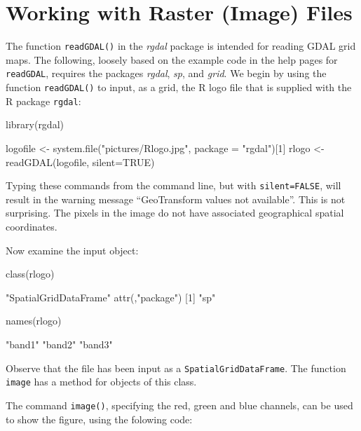 \documentclass{tufte-book}\usepackage[]{graphicx}\usepackage[]{color}
\newcommand{\txtt}[1]{\texttt{#1}}
\begin{document}
\section{Working with Raster (Image) Files}
The function \txtt{readGDAL()} in the {\em rgdal} package is
intended for reading GDAL grid maps.
The following, loosely based on the example code in the help pages for
\txtt{readGDAL}, requires the packages {\em rgdal}, {\em sp}, and
       {\em grid}.  We begin by using the function \txtt{readGDAL()}
to input, as a grid, the R logo file that is supplied with the
R package \txtt{rgdal}:
\begin{Schunk}
\begin{Sinput}
library(rgdal)
\end{Sinput}
\begin{Sinput}
logofile <- system.file("pictures/Rlogo.jpg",
                        package = "rgdal")[1]
rlogo <- readGDAL(logofile, silent=TRUE)
\end{Sinput}
\end{Schunk}
Typing these commands from the command line, but with
\txtt{silent=FALSE}, will result in the warning message ``GeoTransform
values not available''.  This is not surprising.  The pixels in the
image do not have associated geographical spatial coordinates.

Now examine the input object:
\begin{Schunk}
\begin{Sinput}
class(rlogo)
\end{Sinput}
\begin{Soutput}
[1] "SpatialGridDataFrame"
attr(,"package")
[1] "sp"
\end{Soutput}
\begin{Sinput}
names(rlogo)
\end{Sinput}
\begin{Soutput}
[1] "band1" "band2" "band3"
\end{Soutput}
\end{Schunk}
\noindent
Observe that the file has been input as a \txtt{SpatialGridDataFrame}. The
function \txtt{image} has a method for objects of this class.

The command \txtt{image()}, specifying the red, green and blue channels,
can be used to show the figure, using the folowing code:
\end{document}
